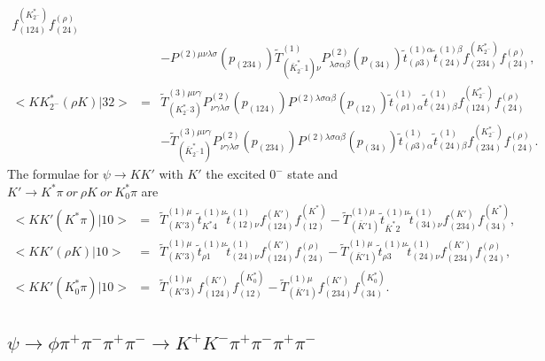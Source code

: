 \begin{eqnarray}
f^{(K^*_{2^-})}_{(124)}f^{(\rho)}_{(24)} \nonumber\\ & &  -
P^{(2)\mu\nu\lambda\sigma}(p_{(234)}) \tilde T^{(1)}_{(\bar
K^*_{2^-}1)\nu} P^{(2)}_{\lambda\sigma\alpha\beta}(p_{(34)})
\tilde t^{(1)\alpha}_{(\rho 3)} \tilde t^{(1)\beta}_{(24)}
f^{(K^*_{2^-})}_{(234)}f^{(\rho)}_{(24)}, \\
<KK^*_{2^-}(\rho K)|32> \!&=&\! \tilde
T^{(3)\mu\nu\gamma}_{(K^*_{2^-}3)}
P^{(2)}_{\nu\gamma\lambda\sigma}(p_{(124)})
P^{(2)\lambda\sigma\alpha\beta}(p_{(12)}) \tilde t^{(1)}_{(\rho
1)\alpha} \tilde t^{(1)}_{(24)\beta}
f^{(K^*_{2^-})}_{(124)}f^{(\rho)}_{(24)} \nonumber\\ & &  - \tilde
T^{(3)\mu\nu\gamma}_{(\bar K^*_{2^-}1)}
P^{(2)}_{\nu\gamma\lambda\sigma}(p_{(234)})
P^{(2)\lambda\sigma\alpha\beta}(p_{(34)}) \tilde t^{(1)}_{(\rho
3)\alpha} \tilde t^{(1)}_{(24)\beta}
f^{(K^*_{2^-})}_{(234)}f^{(\rho)}_{(24)}.
\end{eqnarray}
The formulae for $\psi\to KK'$ with $K'$ the excited $0^{-}$ state
and $K'\to K^*\pi~or~\rho K~or~K^*_0\pi$ are
\begin{eqnarray}
<KK'(K^*\pi)|10> \!&=&\! \tilde T^{(1)\mu}_{(K'3)} \tilde
t^{(1)\nu}_{K^*4}\tilde
t^{(1)}_{(12)\nu}f^{(K')}_{(124)}f^{(K^*)}_{(12)} - \tilde
T^{(1)\mu}_{(\bar K'1)} \tilde t^{(1)\nu}_{\bar K^*2}\tilde
t^{(1)}_{(34)\nu}f^{(K')}_{(234)}f^{(K^*)}_{(34)},\\
<KK'(\rho K)|10> \!&=&\! \tilde T^{(1)\mu}_{(K'3)} \tilde
t^{(1)\nu}_{\rho 1}\tilde
t^{(1)}_{(24)\nu}f^{(K')}_{(124)}f^{(\rho)}_{(24)} - \tilde
T^{(1)\mu}_{(\bar K'1)} \tilde t^{(1)\nu}_{\rho 3}\tilde
t^{(1)}_{(24)\nu}f^{(K')}_{(234)}f^{(\rho)}_{(24)},\\
<KK'(K^*_0\pi)|10> \!&=&\! \tilde T^{(1)\mu}_{(K'3)}
f^{(K')}_{(124)}f^{(K^*_0)}_{(12)} - \tilde T^{(1)\mu}_{(\bar
K'1)}f^{(K')}_{(234)}f^{(K^*_0)}_{(34)}.
\end{eqnarray}

\subsection{$\psi\to\phi\pi^+\pi^-\pi^+\pi^-\to K^+K^-\pi^+\pi^-\pi^+\pi^-$}

